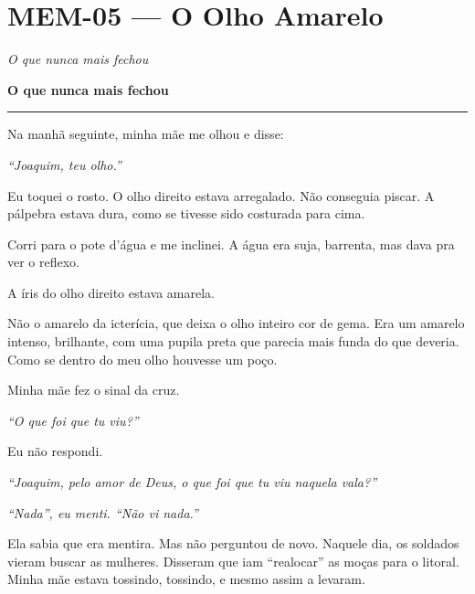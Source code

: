 \section*{\textbf{MEM-05} --- O Olho Amarelo}

\noindent \textit{O que nunca mais fechou}

\noindent \textbf{O que nunca mais fechou}

\vspace{0.5em}\noindent\rule{\textwidth}{0.5pt}\vspace{0.5em}

\noindent Na manhã seguinte, minha mãe me olhou e disse:

\noindent \textit{\textquotedblleft{}Joaquim, teu olho.\textquotedblright{}}

\noindent Eu toquei o rosto. O olho direito estava arregalado. Não conseguia piscar. A pálpebra estava dura, como se tivesse sido costurada para cima.

\noindent Corri para o pote d'água e me inclinei. A água era suja, barrenta, mas dava pra ver o reflexo.

\noindent A íris do olho direito estava amarela.

\noindent Não o amarelo da icterícia, que deixa o olho inteiro cor de gema. Era um amarelo intenso, brilhante, com uma pupila preta que parecia mais funda do que deveria. Como se dentro do meu olho houvesse um poço.

\noindent Minha mãe fez o sinal da cruz.

\noindent \textit{\textquotedblleft{}O que foi que tu viu?\textquotedblright{}}

\noindent Eu não respondi.

\noindent \textit{\textquotedblleft{}Joaquim, pelo amor de Deus, o que foi que tu viu naquela vala?\textquotedblright{}}

\noindent \textit{\textquotedblleft{}Nada\textquotedblright{}\textit{, eu menti. }\textquotedblleft{}Não vi nada.\textquotedblright{}}

\noindent Ela sabia que era mentira. Mas não perguntou de novo. Naquele dia, os soldados vieram buscar as mulheres. Disseram que iam \textquotedblleft{}realocar\textquotedblright{} as moças para o litoral. Minha mãe estava tossindo, tossindo, e mesmo assim a levaram.

